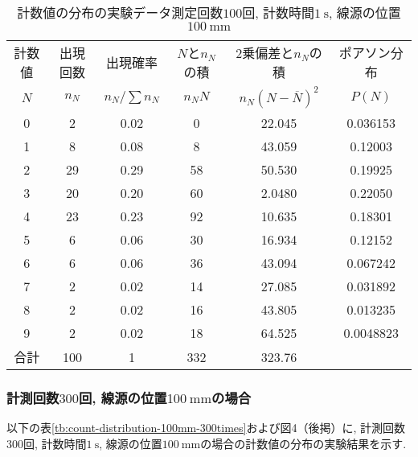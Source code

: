 \documentclass{jarticle}
\begin{document}
\begin{table}[H]
  \caption{計数値の分布の実験データ\protect\linebreak 測定回数$100$回, 計数時間$1\ \mathrm{s}$, 線源の位置$100\ \mathrm{mm}$}
  \label{tb:count-distribution-100mm-100times}
  \hspace{-1cm}
  \begin{tabular}{cccccc}
    \hline
    計数値 & 出現回数 & 出現確率 & $N$と$n_N$の積 & 2乗偏差と$n_N$の積 & ポアソン分布 \\
    $N$ & $n_N$ & $n_N/\sum n_N$ & $n_N N$ & $n_N(N-\overline{N})^2$ & $P(N)$ \\
    \hline
    0 & 2 & 0.02 & 0 & 22.045 & 0.036153 \\
    1 & 8 & 0.08 & 8 & 43.059 & 0.12003 \\
    2 & 29 & 0.29 & 58 & 50.530 & 0.19925 \\
    3 & 20 & 0.20 & 60 & 2.0480 & 0.22050 \\
    4 & 23 & 0.23 & 92 & 10.635 & 0.18301 \\
    5 & 6 & 0.06 & 30 & 16.934 & 0.12152 \\
    6 & 6 & 0.06 & 36 & 43.094 & 0.067242 \\
    7 & 2 & 0.02 & 14 & 27.085 & 0.031892 \\
    8 & 2 & 0.02 & 16 & 43.805 & 0.013235 \\
    9 & 2 & 0.02 & 18 & 64.525 & 0.0048823 \\
    \hline
    合計 & 100 & 1 & 332 & 323.76 & \\
    \hline
  \end{tabular}
\end{table}



\subsubsection{計測回数$300$回, 線源の位置$100\ \mathrm{mm}$の場合}

以下の表\ref{tb:count-distribution-100mm-300times}および図4（後掲）に, 計測回数$300$回, 計数時間$1\ \mathrm{s}$, 線源の位置$100\ \mathrm{mm}$の場合の計数値の分布の実験結果を示す.
\end{document}
